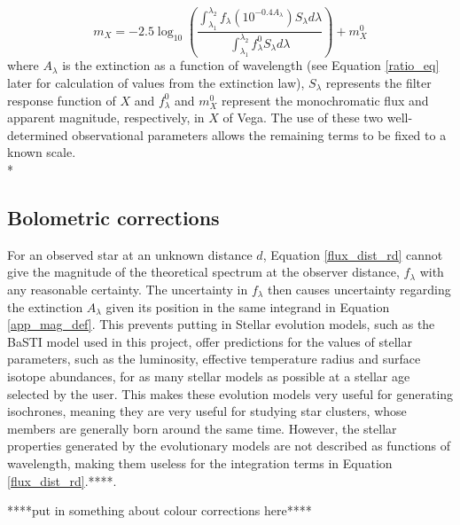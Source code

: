 \documentclass[12pt, a4paper]{report}
\begin{document}
\begin{equation}
m_{X} = -2.5 \log_{10} \left(\frac{ \int_{\lambda_{1}}^{\lambda_{2}} f_{\lambda} \left( 10^{-0.4 A_{\lambda}} \right) S_{\lambda} d\lambda }{ \int_{\lambda_{1}}^{\lambda_{2}} f_{\lambda}^{0} S_{\lambda} d\lambda }\right) + m_{X}^{0}
\label{app_mag_def}
\end{equation}
where $A_{\lambda}$ is the extinction as a function of wavelength (see Equation \ref{ratio_eq} later for calculation of values from the \cite{1989ApJ...345..245C} extinction law), $S_{\lambda}$ represents the filter response function of $X$ and $f_{\lambda}^{0}$ and $m_{X}^{0}$ represent the monochromatic flux and apparent magnitude, respectively, in $X$ of Vega. The use of these two well-determined observational parameters allows the remaining terms to be fixed to a known scale.\\*


\subsection{Bolometric corrections}

For an observed star at an unknown distance $d$, Equation \ref{flux_dist_rd} cannot give the magnitude of the theoretical spectrum at the observer distance, $f_{\lambda}$ with any reasonable certainty. The uncertainty in $f_{\lambda}$ then causes uncertainty regarding the extinction $A_{\lambda}$ given its position in the same integrand in Equation \ref{app_mag_def}. This prevents putting in Stellar evolution models, such as the BaSTI model used in this project, offer predictions for the values of stellar parameters, such as the luminosity, effective temperature radius and surface isotope abundances, for as many stellar models as possible at a stellar age selected by the user. This makes these evolution models very useful for generating isochrones, meaning they are very useful for studying star clusters, whose members are generally born around the same time. However, the stellar properties generated by the evolutionary models are not described as functions of wavelength, making them useless for the integration terms in Equation \ref{flux_dist_rd}.****. 

****put in something about colour corrections here****
\end{document}
